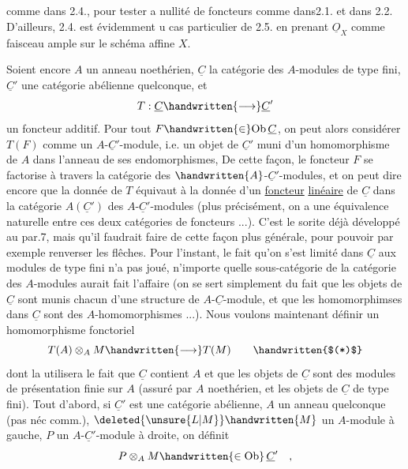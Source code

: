 comme dans 2.4., pour tester a nullité de foncteurs comme dans2.1.
et dans 2.2. D'ailleurs, 2.4. est évidemment u cas particulier de 2.5.
en prenant $\underline O_X$ comme faisceau ample sur le schéma affine $X$.

Soient encore $A$ un anneau noethérien, $\underline C$ la catégorie des $A$-modules\deleted{\unsure{,}}
de type fini, $\underline C'$ une catégorie abélienne quelconque, et
\[
T:\underline C\handwritten{\longrightarrow}\underline C'
\]
un foncteur additif. Pour tout $F\handwritten{\in}\mathrm{Ob}\,\underline C$, on peut alors considérer $T(F)$
comme un $A$-$\underline C'$-module, i.e. un objet de $\underline C'$ muni d'un homomorphisme de
$A$ dans l'anneau de ses endomorphismes, De cette façon, le foncteur $F$ se
factorise à travers la catégorie des $\handwritten{A}$-$\underline C'$-modules, et on peut dire encore
que la donnée de $T$ équivaut à la donnée d'un \uline{foncteur} \uline{linéaire} de $\underline C$ dans
la catégorie  $A(\underline C')$ des $A$-$\underline C'$-modules (plus précisément,  on a une
équivalence naturelle entre ces deux catégories de foncteurs ...). C'est
le sorite déjà développé au par.7, mais qu'il faudrait faire de cette
façon plus générale, pour pouvoir par exemple renverser les flêches. Pour
l'instant, le fait qu'on s'est limité dans $\underline C$ aux modules de type fini
n'a pas joué, n'importe quelle sous-catégorie  de la catégorie des $A$-modules
aurait fait l'affaire (on se sert simplement du fait que les objets de $\underline C$
sont munis  chacun d'une structure de $A$-$\underline C$-module, et que
les homomorphimses dans $\underline C$ sont des $A$-homomorphismes ...). Nous voulons
maintenant définir un homomorphisme fonctoriel
\[
T(A)\otimes_A M\handwritten{\longrightarrow}T(M)\tag*{\handwritten{$(*)$}}
\]
dont la  utilisera le fait que  $\underline C$ contient $A$ et que
les objets de $\underline C$ sont des modules de présentation finie sur $A$ (assuré par
$A$ noethérien, et les objets de $\underline C$ de type fini). Tout d'abord, si $\underline C'$ est
une catégorie abélienne, $A$ un anneau quelconque (pas néc comm.),  $\deleted{\unsure{L|M}}\handwritten{M}$ un
$A$-module à gauche, $P$ un $A$-$\underline C'$-module à droite, on définit
\[
P\otimes_A M\handwritten{\in\mathrm{Ob}}\,\underline C'\quad,
\]
